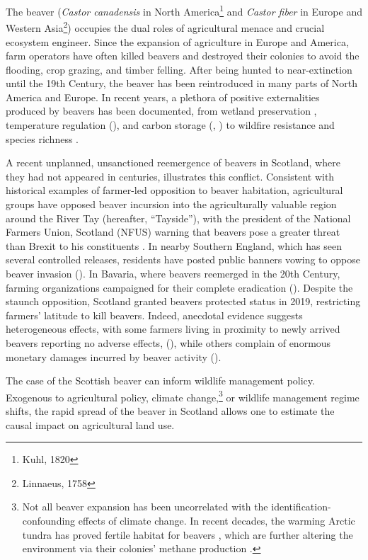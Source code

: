 The beaver (\textit{Castor canadensis} in North America\footnote{Kuhl, 1820} and \textit{Castor fiber} in Europe and Western Asia\footnote{Linnaeus, 1758}) occupies the dual roles of agricultural menace and crucial ecosystem engineer. Since the expansion of agriculture in Europe and America, farm operators have often killed beavers and destroyed their colonies to avoid the flooding, crop grazing, and timber felling. After being hunted to near-extinction until the 19th Century, the beaver has been reintroduced in many parts of North America and Europe. In recent years, a plethora of positive externalities produced by beavers has been documented, from wetland preservation \citep{hood_beaver_2008}, temperature regulation (\cite{dittbrenner_relocated_2022}), and carbon storage (\cite{wohl_landscape-scale_2013}, \cite{johnston_beaver_2014}) to wildfire resistance \citep{fairfax_smokey_2020} and species richness \citep{wright_ecosystem_2002}.

A recent unplanned, unsanctioned reemergence of beavers in Scotland, where they had not appeared in centuries, illustrates this conflict. Consistent with historical examples of farmer-led opposition to beaver habitation, agricultural groups have opposed beaver incursion into the agriculturally valuable region around the River Tay (hereafter, ``Tayside''), with the president of the National Farmers Union, Scotland (NFUS) warning that beavers pose a greater threat than Brexit to his constituents \citep{castle_beavers_2021}. In nearby Southern England, which has seen several controlled releases, residents have posted public banners vowing to oppose beaver invasion (\cite{itooksomephotos_say_2022}).  In Bavaria, where beavers reemerged in the 20th Century, farming organizations campaigned for their complete eradication (\cite{campbell-palmer_managing_2015}). Despite the staunch opposition, Scotland granted beavers protected status in 2019, restricting farmers' latitude to kill beavers. Indeed, anecdotal evidence suggests heterogeneous effects, with some farmers living in proximity to newly arrived beavers reporting no adverse effects, (\cite{campbell_rd_naturescot_2012}), while others complain of enormous monetary damages incurred by beaver activity (\cite{hamilton_tayside_2015}).

The case of the Scottish beaver can inform wildlife management policy. Exogenous to agricultural policy, climate change,\footnote{Not all beaver expansion has been uncorrelated with the identification-confounding effects of climate change. In recent decades, the warming Arctic tundra has proved fertile habitat for beavers \citep{tape_expanding_2022}, which are further altering the environment via their colonies' methane production \citep{clark_beaver_2023}.} or wildlife management regime shifts, the rapid spread of the beaver in Scotland  allows one to estimate the causal impact on agricultural land use.

